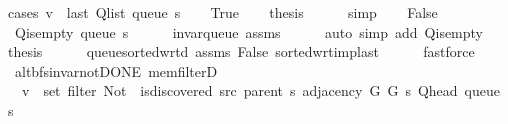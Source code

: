 \begin{isabellebody}
\endisataginvisible
{\isafoldinvisible}%
%
\isadeliminvisible
\isanewline
%
\endisadeliminvisible
%
\isadelimproof
%
\endisadelimproof
%
\isatagproof
{}\isamarkupfalse%
\ {\isacharparenleft}{\kern0pt}cases\ {\isachardoublequoteopen}v\ {\isacharequal}{\kern0pt}\ last\ {\isacharparenleft}{\kern0pt}Q{\isacharunderscore}{\kern0pt}list\ {\isacharparenleft}{\kern0pt}queue\ s{\isacharparenright}{\kern0pt}{\isacharparenright}{\kern0pt}{\isachardoublequoteclose}{\isacharparenright}{\kern0pt}\isanewline
\ \ \isamarkupfalse%
\ True\isanewline
\ \ \isamarkupfalse%
\ {\isacharquery}{\kern0pt}thesis\isanewline
\ \ \ \ \isamarkupfalse%
\ simp\isanewline
{}\isamarkupfalse%
\isanewline
\ \ \isamarkupfalse%
\ False\isanewline
\ \ \isamarkupfalse%
\ {\isachardoublequoteopen}{\isasymnot}\ Q{\isacharunderscore}{\kern0pt}is{\isacharunderscore}{\kern0pt}empty\ {\isacharparenleft}{\kern0pt}queue\ s{\isacharparenright}{\kern0pt}{\isachardoublequoteclose}\isanewline
\ \ \ \ \isamarkupfalse%
\ invar{\isacharunderscore}{\kern0pt}queue\ assms\isanewline
\ \ \ \ \isamarkupfalse%
\ {\isacharparenleft}{\kern0pt}auto\ simp\ add{\isacharcolon}{\kern0pt}\ Q{\isachardot}{\kern0pt}is{\isacharunderscore}{\kern0pt}empty{\isacharparenright}{\kern0pt}\isanewline
\ \ \isamarkupfalse%
\ {\isacharquery}{\kern0pt}thesis\isanewline
\ \ \ \ \isamarkupfalse%
\ queue{\isacharunderscore}{\kern0pt}sorted{\isacharunderscore}{\kern0pt}wrt{\isacharunderscore}{\kern0pt}d\ assms\ False\ sorted{\isacharunderscore}{\kern0pt}wrt{\isacharunderscore}{\kern0pt}imp{\isacharunderscore}{\kern0pt}last\isanewline
\ \ \ \ \isamarkupfalse%
\ fastforce\isanewline
{}\isamarkupfalse%
%
\endisatagproof
{\isafoldproof}%
%
\isadelimproof
\isanewline
%
\endisadelimproof
%
\isadeliminvisible
\isanewline
%
\endisadeliminvisible
%
\isataginvisible
{}\isamarkupfalse%
\ {\isacharparenleft}{\kern0pt}\ alt{\isacharunderscore}{\kern0pt}bfs{\isacharunderscore}{\kern0pt}invar{\isacharunderscore}{\kern0pt}not{\isacharunderscore}{\kern0pt}DONE{\isacharparenright}{\kern0pt}\ mem{\isacharunderscore}{\kern0pt}filterD{\isacharcolon}{\kern0pt}\isanewline
\ \ \ {\isachardoublequoteopen}v\ {\isasymin}\ set\ {\isacharparenleft}{\kern0pt}filter\ {\isacharparenleft}{\kern0pt}Not\ {\isasymcirc}\ is{\isacharunderscore}{\kern0pt}discovered\ src\ {\isacharparenleft}{\kern0pt}parent\ s{\isacharparenright}{\kern0pt}{\isacharparenright}{\kern0pt}\ {\isacharparenleft}{\kern0pt}adjacency\ G{}\ G{}\ s\ {\isacharparenleft}{\kern0pt}Q{\isacharunderscore}{\kern0pt}head\ {\isacharparenleft}{\kern0pt}queue\ s{\isacharparenright}{\kern0pt}{\isacharparenright}{\kern0pt}{\isacharparenright}{\kern0pt}{\isacharparenright}{\kern0pt}{\isachardoublequoteclose}\isanewline

\end{isabellebody}
